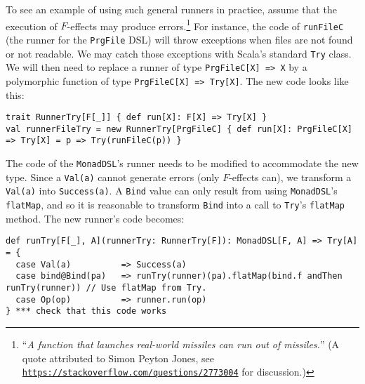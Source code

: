 To see an example of using such general runners in practice, assume
that the execution of $F$-effects may produce errors.\footnote{\textsf{``}\emph{A function that launches real-world missiles
can run out of missiles.}\textsf{''} (A quote attributed to Simon
Peyton Jones, see \texttt{\href{https://stackoverflow.com/questions/2773004}{https://stackoverflow.com/questions/2773004}}
for discussion.)} For instance, the code of \lstinline!runFileC!
(the runner for the \lstinline!PrgFile!
DSL) will throw exceptions when files are not found or not readable.
We may catch those exceptions with Scala\textsf{'}s standard \lstinline!Try!
class. We will then need to replace a runner of type \lstinline!PrgFileC[X] => X!
by a polymorphic function of type \lstinline!PrgFileC[X] => Try[X]!.
The new code looks like this:
\begin{lstlisting}
trait RunnerTry[F[_]] { def run[X]: F[X] => Try[X] }
val runnerFileTry = new RunnerTry[PrgFileC] { def run[X]: PrgFileC[X] => Try[X] = p => Try(runFileC(p)) }
\end{lstlisting}
 The code of the \lstinline!MonadDSL!\textsf{'}s
runner needs to be modified to accommodate the new type. Since a \lstinline!Val(a)!
cannot generate errors (only $F$-effects can), we transform a \lstinline!Val(a)!
into \lstinline!Success(a)!.
A \lstinline!Bind! value
can only result from using \lstinline!MonadDSL!\textsf{'}s
\lstinline!flatMap!, and
so it is reasonable to transform \lstinline!Bind!
into a call to \lstinline!Try!\textsf{'}s
\lstinline!flatMap! method.
The new runner\textsf{'}s code becomes:
\begin{lstlisting}
def runTry[F[_], A](runnerTry: RunnerTry[F]): MonadDSL[F, A] => Try[A] = {
  case Val(a)          => Success(a)
  case bind@Bind(pa)   => runTry(runner)(pa).flatMap(bind.f andThen runTry(runner)) // Use flatMap from Try.
  case Op(op)          => runner.run(op)
} *** check that this code works
\end{lstlisting}
